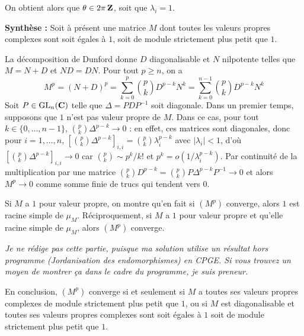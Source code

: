 \begin{correction}
\begin{itemize}
        On obtient alors que $\theta\in 2\pi\operatorname{\mathbf{Z}}$, soit que $\lambda_i=1$.
    \end{itemize}

    \textbf{Synthèse :} Soit à présent une matrice $M$ dont toutes les valeurs propres complexes sont soit égales à $1$,
    soit de module strictement plus petit que $1$.

    La décomposition de Dunford donne $D$ diagonalisable et $N$ nilpotente telles que $M=N+D$ et $ND=DN$.
    Pour tout $p\geq n$, on a 
    \[
        M^p=(N+D)^p=\sum_{k=0}^p\binom pkD^{p-k}N^k=\sum_{k=0}^{n-1}\binom pk D^{p-k}N^k   \tag*{(*)} 
    \]
    Soit $P\in\operatorname{\mathrm{GL}}_n(\operatorname{\mathbf{C}})$ telle que $\Delta=PDP^{-1}$ soit diagonale. 
    Dans un premier temps, supposons que $1$ n'est pas valeur propre de $M$.
    Dans ce cas, pour tout $k\in\lbrace0,\dots,n-1\rbrace$, $\binom pk\Delta^{p-k}\to 0$ : en effet,
    ces matrices sont diagonales, donc pour $i=1,\dots,n$, $\left[\binom pk\Delta^{p-k}\right]_{i,i}=\binom pk\lambda_i^{p-k}$ avec 
    $|\lambda_i|<1$, d'où $\left[\binom pk\Delta^{p-k}\right]_{i,i}\to 0$ car $\binom pk\sim p^k/k!$ et $p^k=o(1/\lambda_i^{p-k})$.
    Par continuité de la multiplication par une matrice $\binom pk D^{p-k}=\binom pkP\Delta^{p-k}P^{-1}\to 0$ et alors $M^p\to 0$ comme somme finie de trucs qui tendent vers $0$.

    Si $M$ a $1$ pour valeur propre, on montre qu'en fait si $(M^p)$ converge, alors $1$ est racine simple de $\mu_M$.
    Réciproquement, si $M$ a $1$ pour valeur propre et qu'elle racine simple de $\mu_M$, alors $(M^p)$ converge.
	
	\textit{Je ne rédige pas cette partie, puisque ma solution utilise un résultat hors programme (Jordanisation des endomorphismes) en CPGE. 
	Si vous trouvez un moyen de montrer ça dans le cadre du programme, je suis preneur.}
	
    En conclusion, $(M^p)$ converge si et seulement si $M$ a toutes ses valeurs propres complexes de module strictement plus petit que $1$,
    ou si $M$ est diagonalisable et toutes ses valeurs propres complexes sont soit égales à $1$ soit de module strictement plus petit que $1$.
\end{correction}

